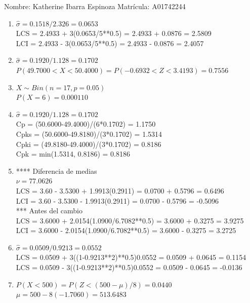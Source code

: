 \documentclass[8pt]{report}
\begin{document}
 \newpage

Nombre: \underline{\hspace*{.2in}}
Katherine Ibarra Espinoza
\underline{\hspace*{.2in}} \quad Matr\'icula:\underline{\hspace*{.2in}}
A01742244
\underline{\hspace*{.2in}} \\

\begin{enumerate}
\item $\hat\sigma = 0.1518/2.326 = 0.0653$\\
LCS = 2.4933 + 3(0.0653/5**0.5) = 2.4933 + 0.0876 = 2.5809\\
LCI = 2.4933 - 3(0.0653/5**0.5) = 2.4933 - 0.0876 = 2.4057
\item $\hat\sigma = 0.1920/1.128 = 0.1702$\\
$P(49.7000 < X < 50.4000) = P(-0.6932 < Z < 3.4193) = 0.7556$\\
\item $X \sim Bin(n=17, p=0.05)$\\
$P(X = 6) = 0.000110$
\item $\hat\sigma = 0.1920/1.128 = 0.1702$\\
Cp = (50.6000-49.4000)/(6*0.1702) = 1.1750\\
Cpks = (50.6000-49.8180)/(3*0.1702) = 1.5314\\
Cpki = (49.8180-49.4000)/(3*0.1702) = 0.8186\\
Cpk = min(1.5314, 0.8186) = 0.8186
\item **** Diferencia de medias\\
$\nu = 77.0626$\\
LCS = 3.60 - 3.5300 + 1.9913(0.2911) = 0.0700 + 0.5796 = 0.6496\\
LCI = 3.60 - 3.5300 - 1.9913(0.2911) = 0.0700 - 0.5796 = -0.5096\\
*** Antes del cambio\\
LCS = 3.6000 + 2.0154(1.0900/6.7082**0.5) = 3.6000 + 0.3275 = 3.9275\\
LCI = 3.6000 - 2.0154(1.0900/6.7082**0.5) = 3.6000 - 0.3275 = 3.2725\\
\item $\hat\sigma = 0.0509/0.9213 = 0.0552$\\
LCS = 0.0509 + 3((1-0.9213**2)**0.5)0.0552 = 0.0509 + 0.0645 = 0.1154\\
LCS = 0.0509 - 3((1-0.9213**2)**0.5)0.0552 = 0.0509 - 0.0645 = -0.0136
\item $P(X < 500) = P(Z < (500-\mu)/8) = 0.0440$\\
$\mu = 500 - 8(-1.7060) = 513.6483$\\
\end{enumerate}
\end{document}
